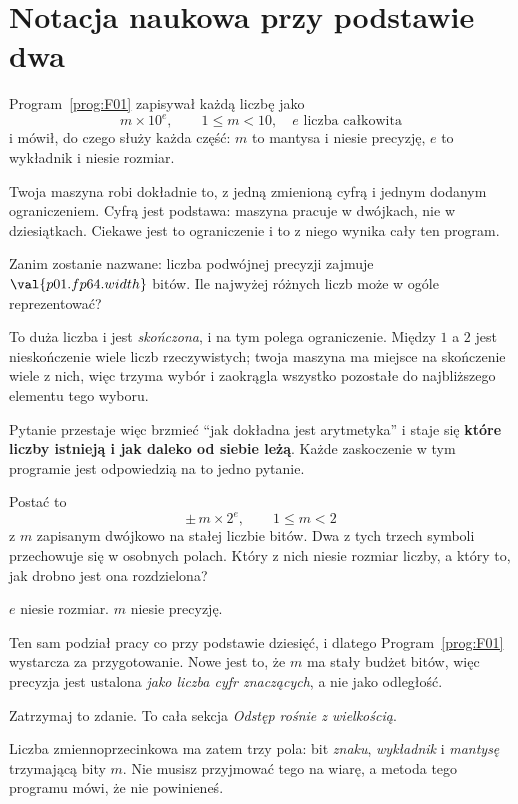 \section{Notacja naukowa przy podstawie dwa}
\label{sec:P01-form}

\begin{fr}
Program~\ref{prog:F01} zapisywał każdą liczbę jako
\[ m \times 10^{e}, \qquad 1 \le m < 10, \quad e \text{ liczba całkowita} \]
i mówił, do czego służy każda część: $m$ to mantysa i niesie precyzję, $e$ to
wykładnik i niesie rozmiar.

Twoja maszyna robi dokładnie to, z jedną zmienioną cyfrą i jednym dodanym
ograniczeniem. Cyfrą jest podstawa: maszyna pracuje w dwójkach, nie w
dziesiątkach. Ciekawe jest to ograniczenie i to z niego wynika cały ten
program.

Zanim zostanie nazwane: liczba podwójnej precyzji zajmuje
$\val{p01.fp64.width}$ bitów. Ile najwyżej różnych liczb może w ogóle
reprezentować?
\nextframe
\end{fr}

\begin{fr}
To duża liczba i jest \emph{skończona}, i na tym polega ograniczenie. Między
$1$ a $2$ jest nieskończenie wiele liczb rzeczywistych; twoja maszyna ma
miejsce na skończenie wiele z nich, więc trzyma wybór i zaokrągla wszystko
pozostałe do najbliższego elementu tego wyboru.

Pytanie przestaje więc brzmieć \enquote{jak dokładna jest arytmetyka} i staje
się \textbf{które liczby istnieją i jak daleko od siebie leżą}. Każde
zaskoczenie w tym programie jest odpowiedzią na to jedno pytanie.

Postać to
\[ \pm\, m \times 2^{e}, \qquad 1 \le m < 2 \]
z $m$ zapisanym dwójkowo na stałej liczbie bitów. Dwa z tych trzech symboli
przechowuje się w osobnych polach. Który z nich niesie rozmiar liczby, a
który to, jak drobno jest ona rozdzielona?
\nextframe
\end{fr}

\begin{fr}
\begin{ansblock}
$e$ niesie rozmiar. $m$ niesie precyzję.
\end{ansblock}

Ten sam podział pracy co przy podstawie dziesięć, i dlatego
Program~\ref{prog:F01} wystarcza za przygotowanie. Nowe jest to, że $m$ ma
stały budżet bitów, więc precyzja jest ustalona \emph{jako liczba cyfr
znaczących}, a nie jako odległość.

Zatrzymaj to zdanie. To cała sekcja \emph{Odstęp rośnie z wielkością}.

Liczba zmiennoprzecinkowa ma zatem trzy pola: bit \emph{znaku},
\emph{wykładnik} i \emph{mantysę} trzymającą bity $m$. Nie musisz przyjmować
tego na wiarę, a metoda tego programu mówi, że nie powinieneś.
\end{fr}

